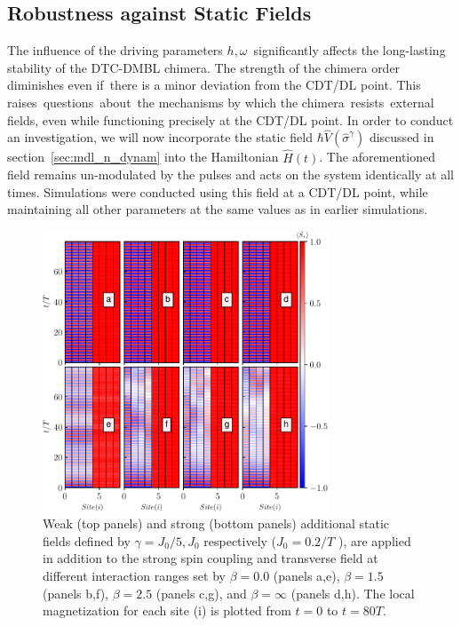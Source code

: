\documentclass[%
nofootinbib,
reprint,
superscriptaddress,
amsmath,amssymb,showkeys,
aps,
prb,
]{revtex4-2}
\begin{document}
	\subsection{\label{sec:level43} Robustness against Static Fields}
	The influence of the driving parameters $h, \omega$ significantly affects the long-lasting stability of the DTC-DMBL chimera. The strength of the chimera order diminishes even if there is a minor deviation from the CDT/DL point. This raises questions about the mechanisms by which the chimera resists external fields, even while functioning precisely at the CDT/DL point.
	In order to conduct an investigation, we will now incorporate the static field $\hbar\hat{V}(\hat{\sigma}^{\gamma})$ discussed in section~\ref{sec:mdl_n_dynam} into the Hamiltonian $\hat{H}(t)$. The aforementioned field remains un-modulated by the pulses and acts on the system identically at all times. Simulations were conducted using this field at a CDT/DL point, while maintaining all other parameters at the same values as in earlier simulations. 
	\begin{figure}
		\begin{center}
			\includegraphics[width=8.5cm]{robustness_N_8.pdf}
		\end{center}
		\caption{Weak (top panels) and strong (bottom panels) additional static fields defined by $\gamma = J_0/5, J_0$ respectively ($J_0=0.2/T$ ), are applied in addition to the strong spin coupling and transverse field at different interaction ranges set by $\beta = 0.0$ (panels a,e), $\beta= 1.5$ (panels b,f), $\beta=2.5$ (panels c,g), and $\beta= \infty$ (panels d,h). The local magnetization for each site (i) is plotted from $t=0$ to $t=80 T$.}
		\label{Fig:robustness}
	\end{figure}
\end{document}

